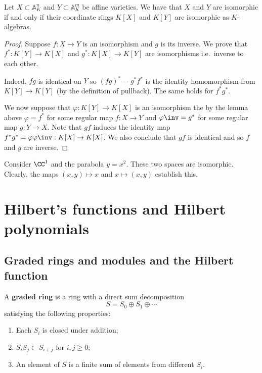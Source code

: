 \documentclass[12pt, a4paper]{article}
\renewcommand{\AA}{\mathbb A}
\begin{document}
\begin{mdthm}
    Let \(X \subset \AA_K^n\) and \(Y\subset \AA_K^m\) be affine varieties. We have that \(X\) and \(Y\) are isomorphic if and only if their coordinate rings \(K[X]\) and \(K[Y]\) are isomorphic as \(K\)-algebras.
\end{mdthm}

\begin{proof}
    Suppose \(f:X \to Y\) is an isomorphism and \(g\) is its inverse. We prove that \(f^*:K[Y] \to K[X]\) and \(g^*:K[X]\to K[Y]\) are isomorphisms i.e.\ inverse to each other. 

    Indeed, \(fg\) is identical on \(Y\) so \((fg)^*=g^*f^*\) is the identity homomorphism from \(K[Y]\to K[Y]\) (by the definition of pullback). The same holds for \(f^*g^*\). 

    We now suppose that \(\varphi:K[Y]\to K[X]\) is an isomorphism the by the lemma above \(\varphi=f^*\) for some regular map \(f:X \to Y\) and \(\varphi\inv=g^*\) for some regular map \(g:Y \to X\). Note that \(gf\) induces the identity map \(f^*g^*=\varphi\varphi\inv : K[X] \to K[X]\). We also conclude that \(gf\) is identical and so \(f\) and \(g\) are inverse.
\end{proof}

\begin{mdexample}
    Consider \(\CC^1\) and the parabola \(y=x^2\). These two spaces are isomorphic. Clearly, the maps \((x,y) \mapsto x\) and \(x\mapsto(x,y)\) establish this. 
\end{mdexample}

\section{Hilbert's functions and Hilbert polynomials}

\subsection{Graded rings and modules and the Hilbert function}

\begin{definition}
    A \textbf{graded ring} is a ring with a direct sum decomposition
    \[S=S_0 \oplus S_1 \oplus \cdots \]
    satisfying the following properties:
    \begin{enumerate}
        \item Each \(S_i\) is closed under addition;
        \item \(S_iS_j \subset S_{i+j}\) for \(i,j\geq 0\);
        \item An element of \(S\) is a finite sum of elements from different \(S_i\).
    \end{enumerate}
\end{definition}
\end{document}
